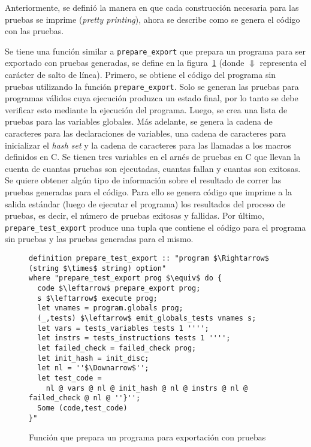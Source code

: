 Anteriormente, se definió la manera en que cada construcción necesaria para las pruebas se imprime (\textit{pretty printing}), ahora se describe como se genera el código con las pruebas.

Se tiene una función similar a \verb|prepare_export| que prepara un programa para ser exportado con pruebas generadas, se define en la figura~\ref{fig:prepare_test_export} (donde $\Downarrow$ representa el carácter de salto de línea).
Primero, se obtiene el código del programa sin pruebas utilizando la función \verb|prepare_export|.
Solo se generan las pruebas para programas válidos cuya ejecución produzca un estado final, por lo tanto se debe verificar esto mediante la ejecución del programa.
Luego, se crea una lista de pruebas para las variables globales.
Más adelante, se genera la cadena de caracteres para las declaraciones de variables, una cadena de caracteres para inicializar el \textit{hash set} y la cadena de caracteres para las llamadas a los macros definidos en C.
Se tienen tres variables en el arnés de pruebas en C que llevan la cuenta de cuantas pruebas son ejecutadas, cuantas fallan y cuantas son exitosas.
Se quiere obtener algún tipo de información sobre el resultado de correr las pruebas generadas para el código.
Para ello se genera código que imprime a la salida estándar (luego de ejecutar el programa) los resultados del proceso de pruebas, es decir, el número de pruebas exitosas y fallidas.
Por último, \verb|prepare_test_export| produce una tupla que contiene el código para el programa sin pruebas y las pruebas generadas para el mismo.

\begin{figure}
\begin{lstlisting}[mathescape=true]
definition prepare_test_export :: "program $\Rightarrow$ (string $\times$ string) option"
where "prepare_test_export prog $\equiv$ do {
  code $\leftarrow$ prepare_export prog;
  s $\leftarrow$ execute prog;
  let vnames = program.globals prog;
  (_,tests) $\leftarrow$ emit_globals_tests vnames s;
  let vars = tests_variables tests 1 '''';
  let instrs = tests_instructions tests 1 '''';
  let failed_check = failed_check prog;
  let init_hash = init_disc;
  let nl = ''$\Downarrow$'';
  let test_code =
    nl @ vars @ nl @ init_hash @ nl @ instrs @ nl @ failed_check @ nl @ ''}'';
  Some (code,test_code)
}"
\end{lstlisting}

\caption{Función que prepara un programa para exportación con pruebas}
\label{fig:prepare_test_export}
\end{figure}


